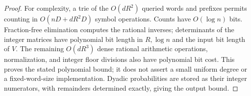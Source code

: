 \begin{proof}
For complexity, a trie of the $O(dR^2)$ queried words and prefixes
permits counting in $O(nD+dR^2D)$ symbol operations. Counts have
$O(\log n)$ bits. Fraction-free elimination computes the rational
inverses; determinants of the integer matrices have polynomial bit
length in $R,\log n$ and the input bit length of $V$. The remaining
$O(dR^3)$ dense rational arithmetic operations, normalization, and
integer floor divisions also have polynomial bit cost. This proves
the stated polynomial bound; it does not assert a small uniform
degree or a fixed-word-size implementation. Dyadic probabilities
are stored as their integer numerators, with remainders determined
exactly, giving the output bound.
\end{proof}
